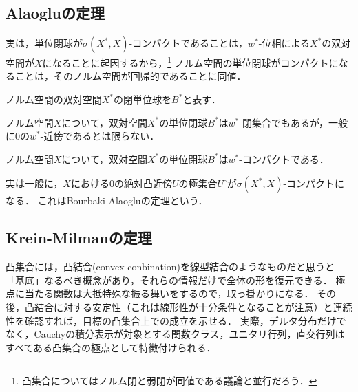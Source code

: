\documentclass[uplatex,dvipdfmx]{jsreport}
\begin{document}
\subsection{Alaogluの定理}

\begin{tcolorbox}[colframe=ForestGreen, colback=ForestGreen!10!white,breakable,colbacktitle=ForestGreen!40!white,coltitle=black,fonttitle=\bfseries\sffamily,
title=]
    実は，単位閉球が$\sigma(X^*,X)$-コンパクトであることは，$w^*$-位相による$X^*$の双対空間が$X$になることに起因するから，\footnote{凸集合についてはノルム閉と弱閉が同値である議論と並行だろう．}
    ノルム空間の単位閉球がコンパクトになることは，そのノルム空間が回帰的であることに同値．
\end{tcolorbox}

\begin{notation}
    ノルム空間の双対空間$X^*$の閉単位球を$B^*$と表す．
\end{notation}

\begin{lemma}
    ノルム空間$X$について，双対空間$X^*$の単位閉球$B^*$は$w^*$-閉集合でもあるが，一般に$0$の$w^*$-近傍であるとは限らない．
\end{lemma}

\begin{theorem}\label{thm-Alaoglu}
    ノルム空間$X$について，双対空間$X^*$の単位閉球$B^*$は$w^*$-コンパクトである．
\end{theorem}
\begin{remarks}
    実は一般に，$X$における$0$の絶対凸近傍$U$の極集合$U^\circ$が$\sigma(X^*,X)$-コンパクトになる．
    これはBourbaki-Alaogluの定理という．
\end{remarks}

\subsection{Krein-Milmanの定理}

\begin{tcolorbox}[colframe=ForestGreen, colback=ForestGreen!10!white,breakable,colbacktitle=ForestGreen!40!white,coltitle=black,fonttitle=\bfseries\sffamily,
title=コンパクト凸集合の代数的特徴付けを与える]
    凸集合には，凸結合(convex conbination)を線型結合のようなものだと思うと「基底」なるべき概念があり，それらの情報だけで全体の形を復元できる．
    極点に当たる関数は大抵特殊な振る舞いをするので，取っ掛かりになる．
    その後，凸結合に対する安定性（これは線形性が十分条件となることが注意）と連続性を確認すれば，目標の凸集合上での成立を示せる．
    実際，デルタ分布だけでなく，Cauchyの積分表示が対象とする関数クラス，ユニタリ行列，直交行列はすべてある凸集合の極点として特徴付けられる．
\end{tcolorbox}
\end{document}
